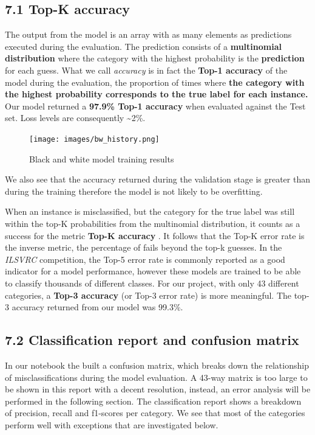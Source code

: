 \documentclass[
  11pt,
]{article}
\begin{document}
\hypertarget{top-k-accuracy}{%
\subsection{7.1 Top-K accuracy}\label{top-k-accuracy}}

The output from the model is an array with as many elements as
predictions executed during the evaluation. The prediction consists of a
\textbf{multinomial distribution} where the category with the highest
probability is the \textbf{prediction} for each guess. What we call
\emph{accuracy} is in fact the \textbf{Top-1 accuracy} of the model
during the evaluation, the proportion of times where \textbf{the
category with the highest probability corresponds to the true label for
each instance. } Our model returned a \textbf{97.9\% Top-1 accuracy}
when evaluated against the Test set. Loss levels are consequently
\textasciitilde2\%.

\begin{figure}
\centering
\texttt{[image: images/bw\_history.png]}
\caption{Black and white model training results}
\end{figure}

We also see that the accuracy returned during the validation stage is
greater than during the training therefore the model is not likely to be
overfitting.

When an instance is misclassified, but the category for the true label
was still within the top-K probabilities from the multinomial
distribution, it counts as a success for the metric \textbf{Top-K
accuracy} . It follows that the Top-K error rate is the inverse metric,
the percentage of fails beyond the top-k guesses. In the \emph{ILSVRC}
competition, the Top-5 error rate is commonly reported as a good
indicator for a model performance, however these models are trained to
be able to classify thousands of different classes. For our project,
with only 43 different categories, a \textbf{Top-3 accuracy} (or Top-3
error rate) is more meaningful. The top-3 accuracy returned from our
model was 99.3\%.

\hypertarget{classification-report-and-confusion-matrix}{%
\subsection{7.2 Classification report and confusion
matrix}\label{classification-report-and-confusion-matrix}}

In our notebook the built a confusion matrix, which breaks down the
relationship of misclassifications during the model evaluation. A 43-way
matrix is too large to be shown in this report with a decent resolution,
instead, an error analysis will be performed in the following section.
The classification report shows a breakdown of precision, recall and
f1-scores per category. We see that most of the categories perform well
with exceptions that are investigated below.
\end{document}
